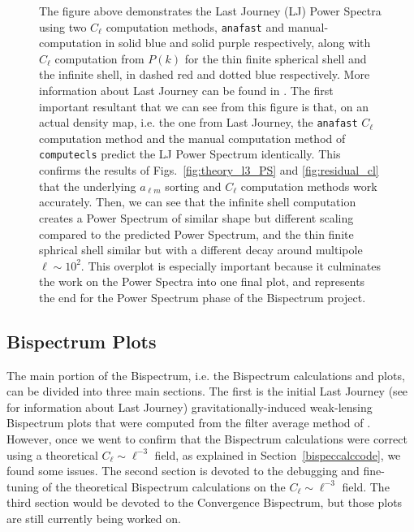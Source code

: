 \documentclass[11pt]{article}
\renewcommand{\_}[1]{\underline{ #1 }}
\newcommand{\us}{\textunderscore}
\begin{document}
{\begin{figure}[H]
    \centering
    \caption{The figure above demonstrates the Last Journey (LJ) Power Spectra using two $C_{\ell}$ computation methods, \texttt{anafast} and manual-computation in solid blue and solid purple respectively, along with $C_{\ell}$ computation from $P(k)$ for the thin finite spherical shell and the infinite shell, in dashed red and dotted blue respectively. More information about Last Journey can be found in \cite{Heitmann_2021}. The first important resultant that we can see from this figure is that, on an actual density map, i.e. the one from Last Journey, the \texttt{anafast} $C_{\ell}$ computation method and the manual computation method of \texttt{compute\us cls} predict the LJ Power Spectrum identically. This confirms the results of Figs.~\ref{fig:theory_l3_PS} and \ref{fig:residual_cl} that the underlying $a_{\ell m}$ sorting and $C_{\ell}$ computation methods work accurately. Then, we can see that the infinite shell computation creates a Power Spectrum of similar shape but different scaling compared to the predicted Power Spectrum, and the thin finite sphrical shell similar but with a different decay around multipole $\ell \sim 10^2$. This overplot is especially important because it culminates the work on the Power Spectra into one final plot, and represents the end for the Power Spectrum phase of the Bispectrum project.}\label{fig:lj_PS}
\end{figure}

\subsection{Bispectrum Plots}\label{bsplots}

The main portion of the Bispectrum, i.e. the Bispectrum calculations and plots, can be divided into three main sections. The first is the initial Last Journey (see \cite{Heitmann_2021} for information about Last Journey) gravitationally-induced weak-lensing Bispectrum plots that were computed from the filter average method of \cite{Munshi_2020}. However, once we went to confirm that the Bispectrum calculations were correct using a theoretical $C_{\ell} \sim \ell^{-3}$ field, as explained in Section~\ref{bispeccalccode}, we found some issues. The second section is devoted to the debugging and fine-tuning of the theoretical Bispectrum calculations on the $C_{\ell} \sim \ell^{-3}$ field. The third section would be devoted to the Convergence Bispectrum, but those plots are still currently being worked on.

}
\end{document}
